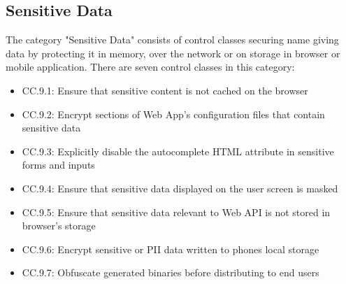 \subsection{Sensitive Data}
The category "Sensitive Data" consists of control classes securing name giving data by protecting it in memory, over the network or on storage in browser or mobile application. There are seven control classes in this category:

\begin{itemize}
    \item CC.9.1: Ensure that sensitive content is not cached on the browser
    \item CC.9.2: Encrypt sections of Web App's configuration files that contain sensitive data
    \item CC.9.3: Explicitly disable the autocomplete HTML attribute in sensitive forms and inputs
    \item CC.9.4: Ensure that sensitive data displayed on the user screen is masked
    \item CC.9.5: Ensure that sensitive data relevant to Web API is not stored in browser's storage
    \item CC.9.6: Encrypt sensitive or PII data written to phones local storage
    \item CC.9.7: Obfuscate generated binaries before distributing to end users
\end{itemize}


